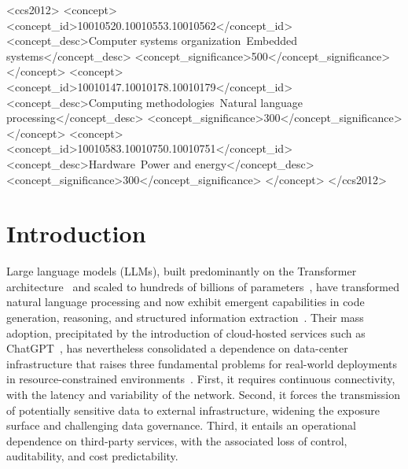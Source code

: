 \documentclass[acmsmall,natbib=false]{acmart}
\begin{document}
\begin{CCSXML}
<ccs2012>
 <concept>
  <concept_id>10010520.10010553.10010562</concept_id>
  <concept_desc>Computer systems organization~Embedded systems</concept_desc>
  <concept_significance>500</concept_significance>
 </concept>
 <concept>
  <concept_id>10010147.10010178.10010179</concept_id>
  <concept_desc>Computing methodologies~Natural language processing</concept_desc>
  <concept_significance>300</concept_significance>
 </concept>
 <concept>
  <concept_id>10010583.10010750.10010751</concept_id>
  <concept_desc>Hardware~Power and energy</concept_desc>
  <concept_significance>300</concept_significance>
 </concept>
</ccs2012>
\end{CCSXML}



\maketitle

\section{Introduction}\label{sec:introduction}

Large language models (LLMs), built predominantly on the Transformer
architecture~\cite{vaswani_attention_2023} and scaled to hundreds of billions
of parameters~\cite{kaplan_scaling_2020,brown_language_2020}, have transformed
natural language processing and now exhibit emergent capabilities in code
generation, reasoning, and structured information
extraction~\cite{emergent}. Their mass adoption, precipitated by the
introduction of cloud-hosted services such as ChatGPT~\cite{hu_chatgpt_2023},
has nevertheless consolidated a dependence on data-center infrastructure that
raises three fundamental problems for real-world deployments in
resource-constrained environments~\cite{friha_llm-based_2024}. First, it
requires continuous connectivity, with the latency and variability of the
network. Second, it forces the transmission of potentially sensitive data to
external infrastructure, widening the exposure surface and challenging data
governance. Third, it entails an operational dependence on third-party
services, with the associated loss of control, auditability, and cost
predictability.
\end{document}
